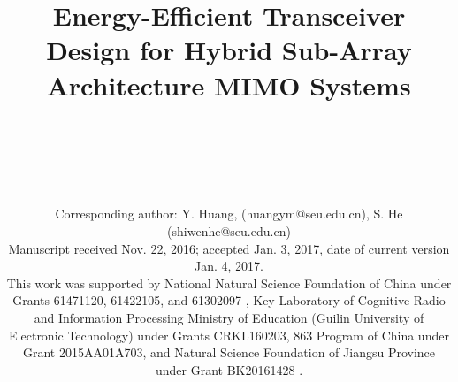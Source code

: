 \documentclass[11pt,draftcls,onecolumn]{IEEEtran}
\begin{document}
\title{Energy-Efficient Transceiver Design for Hybrid Sub-Array Architecture MIMO Systems}
\author{\\
\begin{flushleft}
\\
\\
\\
Corresponding author: Y. Huang, (huangym@seu.edu.cn), S. He (shiwenhe@seu.edu.cn)\\
Manuscript received Nov. 22, 2016; accepted Jan. 3, 2017, date of current version Jan. 4, 2017.\\
This work was supported by National Natural Science Foundation of China under Grants 61471120, 61422105, and 61302097
, Key Laboratory of Cognitive Radio and Information Processing Ministry of Education (Guilin University of Electronic Technology) under Grants CRKL160203, 863 Program of China under Grant 2015AA01A703, and Natural Science Foundation of Jiangsu Province under Grant BK20161428
.
\end{flushleft}
}
\maketitle
\vspace{-.6 in}
\end{document}
